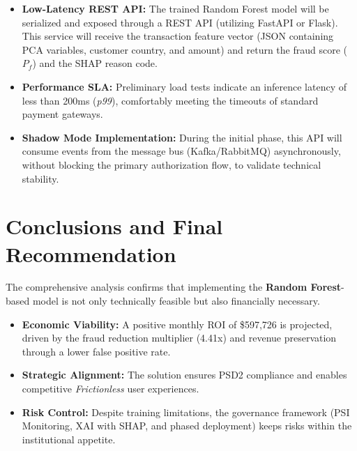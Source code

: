 \documentclass[12pt,a4paper]{report}
\begin{document}
\begin{itemize}
    \item \textbf{Low-Latency REST API:} The trained Random Forest model will be serialized and exposed through a REST API (utilizing FastAPI or Flask). This service will receive the transaction feature vector (JSON containing PCA variables, customer country, and amount) and return the fraud score (\(P_f\)) and the SHAP reason code.
    
    \item \textbf{Performance SLA:} Preliminary load tests indicate an inference latency of less than 200ms (\textit{p99}), comfortably meeting the timeouts of standard payment gateways.
    
    \item \textbf{Shadow Mode Implementation:} During the initial phase, this API will consume events from the message bus (Kafka/RabbitMQ) asynchronously, without blocking the primary authorization flow, to validate technical stability.
\end{itemize}


\section{Conclusions and Final Recommendation}

The comprehensive analysis confirms that implementing the \textbf{Random Forest}-based model is not only technically feasible but also financially necessary.

\begin{itemize}
    \item \textbf{Economic Viability:} A positive monthly ROI of \$597,726 is projected, driven by the fraud reduction multiplier (4.41x) and revenue preservation through a lower false positive rate.
    \item \textbf{Strategic Alignment:} The solution ensures PSD2 compliance and enables competitive \textit{Frictionless} user experiences.
    \item \textbf{Risk Control:} Despite training limitations, the governance framework (PSI Monitoring, XAI with SHAP, and phased deployment) keeps risks within the institutional appetite.
\end{itemize}

\end{document}
